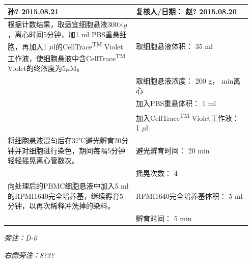\documentclass[UTF8,10pt,a4paper,fontset=fandol]{ctexart}
\newcommand{\fieldvalue}[1]{#1}
\newcommand{\handwritten}[1]{#1}
\begin{document}
\begin{tabular}{|p{0.50\linewidth}|p{0.45\linewidth}|}
\fieldvalue{\handwritten{孙? 2015.08.21}}&
复核人/日期：
\fieldvalue{\handwritten{赵? 2015.08.20}}\\
\hline
根据计数结果，取适宜细胞悬液300$\times g$，离心时间5分钟，加1 ml PBS重悬细胞，再加入1 $\mu$l的CellTrace\textsuperscript{TM} Violet工作液，使细胞悬液中含CellTrace\textsuperscript{TM} Violet的终浓度为5$\mu$M。&
取细胞悬液体积：
\fieldvalue{\handwritten{35}} ml\\
&取细胞悬液浓度：
\fieldvalue{\handwritten{200}} g，\underline{\hspace{0.7cm}} min离心\\
&加入PBS重悬体积：
\fieldvalue{\handwritten{1}} ml\\
&加入CellTrace\textsuperscript{TM} Violet工作液：
\fieldvalue{\handwritten{1}} $\mu$l\\
\hline
将细胞悬液混匀后在37℃避光孵育20分钟并对细胞进行染色，期间每隔5分钟轻轻摇晃离心管数次。&
避光孵育时间：
\fieldvalue{\handwritten{20}} min\\
&摇晃次数：
\fieldvalue{\handwritten{4}}\\
\hline
向处理后的PBMC细胞悬液中加入5 ml的RPMI1640完全培养基，继续孵育5分钟，以再次稀释冲洗掉的染料。&
RPMI1640完全培养基体积：
\fieldvalue{\handwritten{5}} ml\\
&孵育时间：
\fieldvalue{\handwritten{5}} min\\
\hline
\end{tabular}

\vspace{4pt}
\textit{旁注：\handwritten{D-0}}

\textit{右侧旁注：\handwritten{8?3?}}
\end{document}
